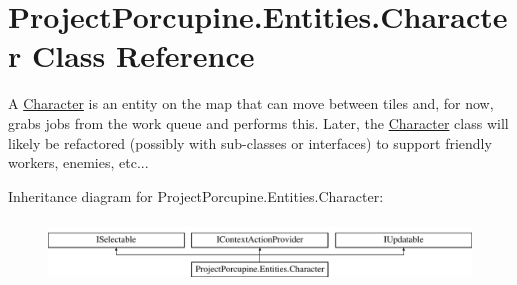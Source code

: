 \hypertarget{class_project_porcupine_1_1_entities_1_1_character}{}\section{Project\+Porcupine.\+Entities.\+Character Class Reference}
\label{class_project_porcupine_1_1_entities_1_1_character}


A \hyperlink{class_project_porcupine_1_1_entities_1_1_character}{Character} is an entity on the map that can move between tiles and, for now, grabs jobs from the work queue and performs this. Later, the \hyperlink{class_project_porcupine_1_1_entities_1_1_character}{Character} class will likely be refactored (possibly with sub-\/classes or interfaces) to support friendly workers, enemies, etc...  


Inheritance diagram for Project\+Porcupine.\+Entities.\+Character\+:\begin{figure}[H]
\begin{center}
\leavevmode
\includegraphics[height=1.674140cm]{class_project_porcupine_1_1_entities_1_1_character}
\end{center}
\end{figure}
